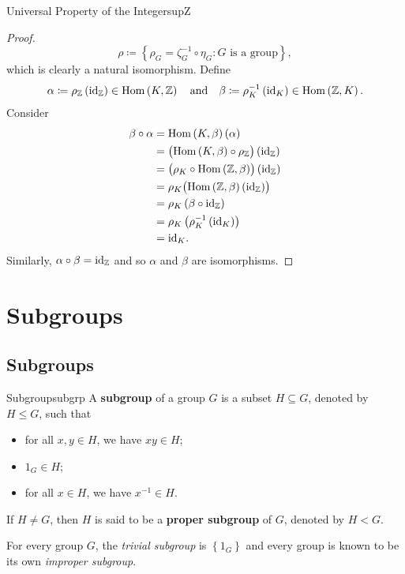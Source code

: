 \documentclass[math]{amznotes}
\theoremstyle{remark}
\newcommand{\Hom}{\mathrm{Hom}}
\newcommand{\0}{\mathbf{0}}
\newcommand{\1}{\mathbf{1}}
\begin{document}
\begin{thmbox}{Universal Property of the Integers}{upZ}
\begin{proof}
        \begin{equation*}
            \rho \coloneqq \left\{\rho_G = \zeta^{-1}_G \circ \eta_G \colon G \textrm{ is a group}\right\},
        \end{equation*}
        which is clearly a natural isomorphism. Define 
        \begin{equation*}
            \alpha \coloneqq \rho_{\Z}\left(\mathrm{id}_{\Z}\right) \in \Hom\left(K, \Z\right) \quad\textrm{and}\quad \beta \coloneqq \rho^{-1}_K\left(\mathrm{id}_K\right) \in \Hom\left(\Z, K\right).
        \end{equation*}
        Consider 
        \begin{align*}
            \beta \circ \alpha & = \mathrm{Hom}\left(K, \beta\right)\left(\alpha\right) \\ 
            & = \bigl(\Hom\left(K, \beta\right) \circ \rho_{\Z}\bigr)\left(\mathrm{id}_{\Z}\right) \\
            & = \bigl(\rho_{K} \circ \Hom\left(\Z, \beta\right)\bigr)\left(\mathrm{id}_{\Z}\right) \\
            & = \rho_K\bigl(\Hom\left(\Z, \beta\right)\left(\mathrm{id}_{\Z}\right)\bigr) \\
            & = \rho_K\left(\beta \circ \mathrm{id}_{\Z}\right) \\
            & = \rho_K\left(\rho_{K}^{-1}\left(\mathrm{id}_K\right)\right) \\
            & = \mathrm{id}_K.
        \end{align*}
        Similarly, $\alpha \circ \beta = \mathrm{id}_{\mathbb{Z}}$ and so $\alpha$ and $\beta$ are isomorphisms.
    \end{proof}
\end{thmbox}
\chapter{Subgroups}
\section{Subgroups}
\begin{dfnbox}{Subgroup}{subgrp}
    A {\color{red} \textbf{subgroup}} of a group $G$ is a subset $H \subseteq G$, denoted by $H \leq G$, such that 
    \begin{itemize}
        \item for all $x, y \in H$, we have $xy \in H$;
        \item $1_G \in H$;
        \item for all $x \in H$, we have $x^{-1} \in H$.
    \end{itemize}
    If $H \neq G$, then $H$ is said to be a {\color{red} \textbf{proper subgroup}} of $G$, denoted by $H < G$.
\end{dfnbox}
For every group $G$, the \textit{trivial subgroup} is $\left\{1_G\right\}$ and every group is known to be its own \textit{improper subgroup}.
\end{document}
